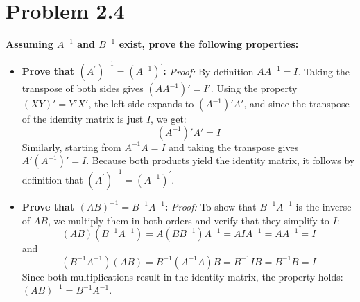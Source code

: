 \documentclass{article}
\begin{document}
\section*{Problem 2.4}
\noindent \textbf{Assuming $A^{-1}$ and $B^{-1}$ exist, prove the following properties:}
\begin{itemize}
    \item[(a)] \textbf{Prove that $(A^{\prime})^{-1}=(A^{-1})^{\prime}$:}
    \textit{Proof:} By definition $AA^{-1} = I$. Taking the transpose of both sides gives $(AA^{-1})' = I'$. Using the property $(XY)' = Y'X'$, the left side expands to $(A^{-1})' A'$, and since the transpose of the identity matrix is just $I$, we get:
    \[
    (A^{-1})' A' = I
    \]
    Similarly, starting from $A^{-1}A = I$ and taking the transpose gives $A'(A^{-1})' = I$. Because both products yield the identity matrix, it follows by definition that $(A^{\prime})^{-1} = (A^{-1})^{\prime}$.

    \item[(b)] \textbf{Prove that $(AB)^{-1}=B^{-1}A^{-1}$:}
    \textit{Proof:} To show that $B^{-1}A^{-1}$ is the inverse of $AB$, we multiply them in both orders and verify that they simplify to $I$:
    \[
    (AB)(B^{-1}A^{-1}) = A(BB^{-1})A^{-1} = AIA^{-1} = AA^{-1} = I
    \]
    and
    \[
    (B^{-1}A^{-1})(AB) = B^{-1}(A^{-1}A)B = B^{-1}IB = B^{-1}B = I
    \]
    Since both multiplications result in the identity matrix, the property holds: $(AB)^{-1} = B^{-1}A^{-1}$.
\end{itemize}
\end{document}
